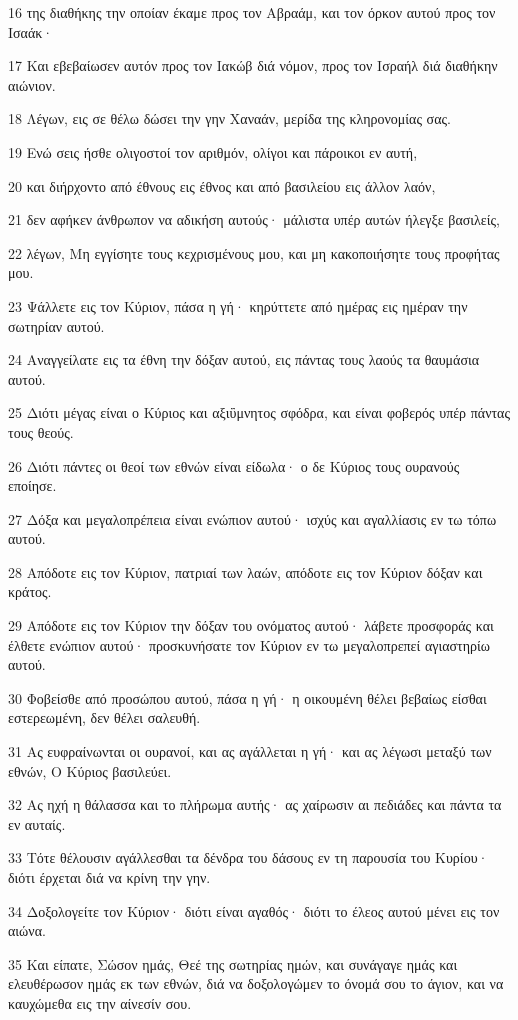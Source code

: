 \par 16 της διαθήκης την οποίαν έκαμε προς τον Αβραάμ, και τον όρκον αυτού προς τον Ισαάκ·
\par 17 Και εβεβαίωσεν αυτόν προς τον Ιακώβ διά νόμον, προς τον Ισραήλ διά διαθήκην αιώνιον.
\par 18 Λέγων, εις σε θέλω δώσει την γην Χαναάν, μερίδα της κληρονομίας σας.
\par 19 Ενώ σεις ήσθε ολιγοστοί τον αριθμόν, ολίγοι και πάροικοι εν αυτή,
\par 20 και διήρχοντο από έθνους εις έθνος και από βασιλείου εις άλλον λαόν,
\par 21 δεν αφήκεν άνθρωπον να αδικήση αυτούς· μάλιστα υπέρ αυτών ήλεγξε βασιλείς,
\par 22 λέγων, Μη εγγίσητε τους κεχρισμένους μου, και μη κακοποιήσητε τους προφήτας μου.
\par 23 Ψάλλετε εις τον Κύριον, πάσα η γή· κηρύττετε από ημέρας εις ημέραν την σωτηρίαν αυτού.
\par 24 Αναγγείλατε εις τα έθνη την δόξαν αυτού, εις πάντας τους λαούς τα θαυμάσια αυτού.
\par 25 Διότι μέγας είναι ο Κύριος και αξιΰμνητος σφόδρα, και είναι φοβερός υπέρ πάντας τους θεούς.
\par 26 Διότι πάντες οι θεοί των εθνών είναι είδωλα· ο δε Κύριος τους ουρανούς εποίησε.
\par 27 Δόξα και μεγαλοπρέπεια είναι ενώπιον αυτού· ισχύς και αγαλλίασις εν τω τόπω αυτού.
\par 28 Απόδοτε εις τον Κύριον, πατριαί των λαών, απόδοτε εις τον Κύριον δόξαν και κράτος.
\par 29 Απόδοτε εις τον Κύριον την δόξαν του ονόματος αυτού· λάβετε προσφοράς και έλθετε ενώπιον αυτού· προσκυνήσατε τον Κύριον εν τω μεγαλοπρεπεί αγιαστηρίω αυτού.
\par 30 Φοβείσθε από προσώπου αυτού, πάσα η γή· η οικουμένη θέλει βεβαίως είσθαι εστερεωμένη, δεν θέλει σαλευθή.
\par 31 Ας ευφραίνωνται οι ουρανοί, και ας αγάλλεται η γή· και ας λέγωσι μεταξύ των εθνών, Ο Κύριος βασιλεύει.
\par 32 Ας ηχή η θάλασσα και το πλήρωμα αυτής· ας χαίρωσιν αι πεδιάδες και πάντα τα εν αυταίς.
\par 33 Τότε θέλουσιν αγάλλεσθαι τα δένδρα του δάσους εν τη παρουσία του Κυρίου· διότι έρχεται διά να κρίνη την γην.
\par 34 Δοξολογείτε τον Κύριον· διότι είναι αγαθός· διότι το έλεος αυτού μένει εις τον αιώνα.
\par 35 Και είπατε, Σώσον ημάς, Θεέ της σωτηρίας ημών, και συνάγαγε ημάς και ελευθέρωσον ημάς εκ των εθνών, διά να δοξολογώμεν το όνομά σου το άγιον, και να καυχώμεθα εις την αίνεσίν σου.
